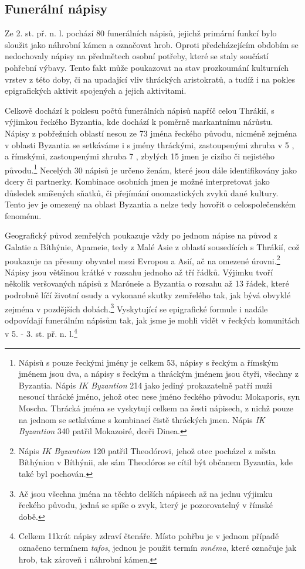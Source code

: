 \subsection[funerální-nápisy-7]{Funerální nápisy}

Ze 2. st. př. n. l. pochází 80 funerálních nápisů, jejichž primární funkcí bylo sloužit jako náhrobní kámen a označovat hrob. Oproti předcházejícím obdobím se nedochovaly nápisy na předmětech osobní potřeby, které se staly součástí pohřební výbavy. Tento fakt může poukazovat na stav prozkoumání kulturních vrstev z této doby, či na upadající vliv thráckých aristokratů, a tudíž i na pokles epigrafických aktivit spojených a jejich aktivitami.

Celkově dochází k poklesu počtů funerálních nápisů napříč celou Thrákií, s výjimkou řeckého Byzantia, kde dochází k poměrně markantnímu nárůstu. Nápisy z pobřežních oblastí nesou ze 73  jména řeckého původu, nicméně zejména v oblasti Byzantia se setkáváme i s jmény thráckými, zastoupenými zhruba v 5 , a římskými, zastoupenými zhruba 7 , zbylých 15  jmen je cizího či nejistého původu.\footnote{Nápisů s pouze řeckými jmény je celkem 53, nápisy s řeckým a římským jménem jsou dva, a nápisy s řeckým a thráckým jménem jsou čtyři, všechny z Byzantia. Nápis {\em IK Byzantion} 214 jako jediný prokazatelně patří muži nesoucí thrácké jméno, jehož otec nese jméno řeckého původu: Mokaporis, syn Moscha. Thrácká jména se vyskytují celkem na šesti nápisech, z nichž pouze na jednom se setkáváme s kombinací čistě thráckých jmen. Nápis {\em IK Byzantion} 340 patřil Mokazoiré, dceři Dinea.} Necelých 30  nápisů je určeno ženám, které jsou dále identifikovány jako dcery či partnerky. Kombinace osobních jmen je možné interpretovat jako důsledek smíšených sňatků, či přejímání onomastických zvyků dané kultury. Tento jev je omezený na oblast Byzantia a nelze tedy hovořit o celospolečenském fenoménu.

Geografický původ zemřelých poukazuje vždy po jednom nápise na původ z Galatie a Bíthýnie, Apameie, tedy z Malé Asie z oblastí sousedících s Thrákií, což poukazuje na přesuny obyvatel mezi Evropou a Asií, ač na omezené úrovni.\footnote{Nápis {\em IK Byzantion} 120 patřil Theodórovi, jehož otec pocházel z města Bíthýnion v Bíthýnii, ale sám Theodóros se cítil být občanem Byzantia, kde také byl pochován.} Nápisy jsou většinou krátké v rozsahu jednoho až tří řádků. Výjimku tvoří několik veršovaných nápisů z Maróneie a Byzantia o rozsahu až 13 řádek, které podrobně líčí životní osudy a vykonané skutky zemřelého tak, jak bývá obvyklé zejména v pozdějších dobách.\footnote{Ač jsou všechna jména na těchto delších nápisech až na jednu výjimku řeckého původu, jedná se spíše o zvyk, který je pozorovatelný v římské době.} Vyskytující se epigrafické formule i nadále odpovídají funerálním nápisům tak, jak jsme je mohli vidět v řeckých komunitách v 5. - 3. st. př. n. l.\footnote{Celkem 11krát nápisy zdraví čtenáře. Místo pohřbu je v jednom případě označeno termínem {\em tafos}, jednou je použit termín {\em mnéma}, které označuje jak hrob, tak zároveň i náhrobní kámen.}

